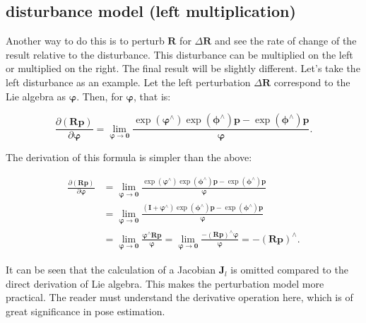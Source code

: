 \subsection{disturbance model (left multiplication)}
Another way to do this is to perturb $\bm{R}$ for $\Delta \bm{R}$ and see the rate of change of the result relative to the disturbance. This disturbance can be multiplied on the left or multiplied on the right. The final result will be slightly different. Let's take the left disturbance as an example. Let the left perturbation $\Delta \bm{R}$ correspond to the Lie algebra as $\boldsymbol{\varphi}$. Then, for $\boldsymbol{\varphi}$, that is:

\begin{equation}
\frac{{\partial \left( {\bm{Rp}} \right)}}{{\partial \boldsymbol{\varphi} }} = \mathop {\lim }\limits_{\boldsymbol{\varphi}  \to \bm{0}} \frac{{\exp \left( {{\boldsymbol{\varphi} ^ \wedge }} \right)\exp \left( {{\boldsymbol{\phi} ^ \wedge }} \right)\bm{p} - \exp \left( {{\boldsymbol{\phi} ^ \wedge }} \right)\bm{p}}}{\boldsymbol{\varphi} }.
\end{equation}

The derivation of this formula is simpler than the above:

\begin{align*}
\frac{{\partial \left( {\bm{Rp}} \right)}}{{\partial \boldsymbol{\varphi} }} &= \mathop {\lim }\limits_{\boldsymbol{\varphi}  \to \bm{0}} \frac{{\exp \left( {{\boldsymbol{\varphi} ^ \wedge }} \right)\exp \left( {{\boldsymbol{\phi} ^ \wedge }} \right)\bm{p} - \exp \left( {{\boldsymbol{\phi} ^ \wedge }} \right)\bm{p}}}{ \boldsymbol{\varphi} }\\
&= \mathop {\lim }\limits_{\boldsymbol{\varphi } \to \bm{0}} \frac{{\left( {\bm{I} + {\boldsymbol{\varphi }^ \wedge }} \right)\exp \left( {{\boldsymbol{\phi} ^ \wedge }} \right)\bm{p} - \exp \left( {{\boldsymbol{\phi} ^ \wedge }} \right)\bm{p}}}{\boldsymbol{\varphi} }\\
&= \mathop {\lim }\limits_{\boldsymbol{\varphi}  \to \bm{0}} \frac{{{\boldsymbol{\varphi} ^ \wedge }\bm{Rp}}}{\boldsymbol{\varphi} } = \mathop {\lim }\limits_{\boldsymbol{\varphi}  \to \bm{0}} \frac{{ - {{\left( \bm{Rp} \right)}^ \wedge }\boldsymbol{\varphi} }}{\boldsymbol{\varphi} } =  - {\left( \bm{Rp} \right)^ \wedge }.
\end{align*}

It can be seen that the calculation of a Jacobian $\bm{J}_l$ is omitted compared to the direct derivation of Lie algebra. This makes the perturbation model more practical. The reader must understand the derivative operation here, which is of great significance in pose estimation.